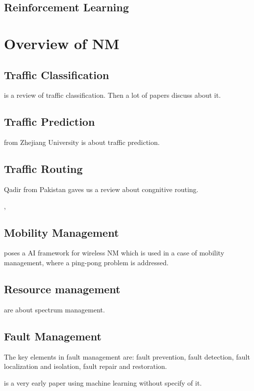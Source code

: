 \documentclass[journal,UTF8]{IEEEtran}
\begin{document}
\subsection{Reinforcement Learning}
\section{Overview of NM}
\subsection{Traffic Classification}
\cite{Williams2006A} is a review of traffic classification. Then a lot of papers\cite{Jin2012A,Huang2012On,Soysal2010Machine} discuss about it.
\subsection{Traffic Prediction}
\cite{Hua2017Traffic} from Zhejiang University is about traffic prediction.
\subsection{Traffic Routing}
Qadir\cite{Qadir2016Artificial} from Pakistan gaves us a review about congnitive routing.

\cite{Hui2002Reinforcement}, \cite{Saleem2017Clustering}



\subsection{Mobility Management}
\cite{Cao2017AIF} poses a AI framework for wireless NM which is used in a case of mobility management, where a ping-pong problem is addressed.  

\subsection{Resource management}
\cite{Morozs2016Cognitive,L2017Primary} are about spectrum management.

\subsection{Fault Management}

The key elements in fault management are: fault prevention, fault detection, fault localization and isolation, fault repair and restoration.

\cite{Maxion1990Anomaly} is a very early paper using machine learning without specify of it.
\end{document}
